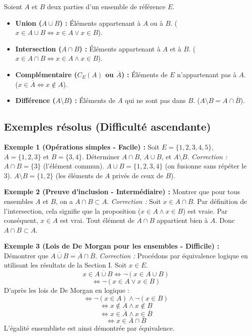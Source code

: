 Soient $A$ et $B$ deux parties d'un ensemble de référence $E$.
\begin{itemize}
    \item \textbf{Union ($A \cup B$) :} Éléments appartenant à $A$ ou à $B$. ($x \in A \cup B \iff x \in A \lor x \in B$).
    \item \textbf{Intersection ($A \cap B$) :} Éléments appartenant à $A$ et à $B$. ($x \in A \cap B \iff x \in A \land x \in B$).
    \item \textbf{Complémentaire ($C_E(A)$ ou $\overline{A}$) :} Éléments de $E$ n'appartenant pas à $A$. ($x \in \overline{A} \iff x \notin A$).
    \item \textbf{Différence ($A \setminus B$) :} Éléments de $A$ qui ne sont pas dans $B$. ($A \setminus B = A \cap \overline{B}$).
\end{itemize}

\subsection{Exemples résolus (Difficulté ascendante)}

\textbf{Exemple 1 (Opérations simples - Facile) :}
Soit $E = \{1, 2, 3, 4, 5\}$, $A = \{1, 2, 3\}$ et $B = \{3, 4\}$.
Déterminer $A \cap B$, $A \cup B$, et $A \setminus B$.
\textit{Correction :}
$A \cap B = \{3\}$ (l'élément commun).
$A \cup B = \{1, 2, 3, 4\}$ (on fusionne sans répéter le 3).
$A \setminus B = \{1, 2\}$ (les éléments de $A$ privés de ceux de $B$).

\textbf{Exemple 2 (Preuve d'inclusion - Intermédiaire) :}
Montrer que pour tous ensembles $A$ et $B$, on a $A \cap B \subset A$.
\textit{Correction :} Soit $x \in A \cap B$. Par définition de l'intersection, cela signifie que la proposition ($x \in A \land x \in B$) est vraie. Par conséquent, $x \in A$ est vrai. Tout élément de $A \cap B$ appartient bien à $A$. Donc $A \cap B \subset A$.

\textbf{Exemple 3 (Lois de De Morgan pour les ensembles - Difficile) :}
Démontrer que $\overline{A \cup B} = \overline{A} \cap \overline{B}$.
\textit{Correction :} Procédons par équivalence logique en utilisant les résultats de la Section I. Soit $x \in E$.
$$ x \in \overline{A \cup B} \iff \neg(x \in A \cup B) $$
$$ \iff \neg(x \in A \lor x \in B) $$
D'après les lois de De Morgan en logique :
$$ \iff \neg(x \in A) \land \neg(x \in B) $$
$$ \iff x \notin A \land x \notin B $$
$$ \iff x \in \overline{A} \land x \in \overline{B} $$
$$ \iff x \in \overline{A} \cap \overline{B} $$
L'égalité ensembliste est ainsi démontrée par équivalence.

